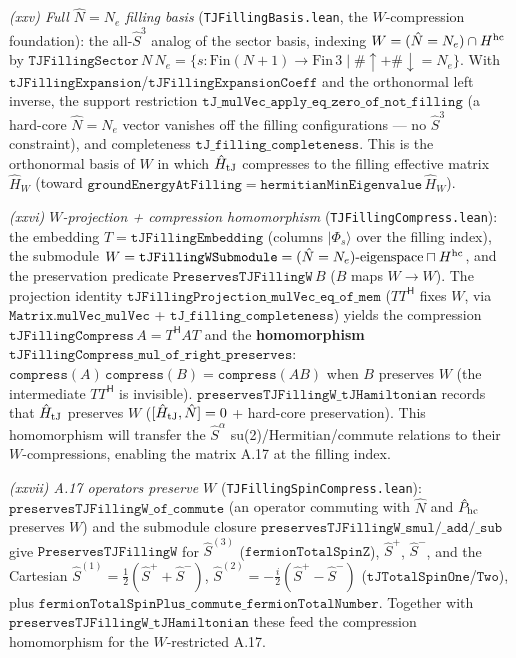 \documentclass[a4paper,11pt]{article}
\begin{document}
\emph{(xxv) Full $\hat N=N_e$ filling basis} (\texttt{TJFillingBasis.lean}, the $W$-compression
foundation): the all-$\hat S^3$ analog of the sector basis, indexing $W=(\hat N=N_e)\cap H^{\rm hc}$
by $\texttt{TJFillingSector}\,N\,N_e=\{s : \mathrm{Fin}(N{+}1)\to\mathrm{Fin}\,3 \mid \#{\uparrow}+\#{\downarrow}=N_e\}$.
With $\texttt{tJFillingExpansion}$/$\texttt{tJFillingExpansionCoeff}$ and the orthonormal left inverse,
the support restriction $\texttt{tJ\_mulVec\_apply\_eq\_zero\_of\_not\_filling}$ (a hard-core
$\hat N=N_e$ vector vanishes off the filling configurations — no $\hat S^3$ constraint), and
completeness $\texttt{tJ\_filling\_completeness}$.  This is the orthonormal basis of $W$ in which
$\hat H_{\rm tJ}$ compresses to the filling effective matrix $\hat H_W$ (toward
$\texttt{groundEnergyAtFilling}=\texttt{hermitianMinEigenvalue}\,\hat H_W$).

\emph{(xxvi) $W$-projection + compression homomorphism} (\texttt{TJFillingCompress.lean}): the
embedding $T=\texttt{tJFillingEmbedding}$ (columns $|\Phi_s\rangle$ over the filling index), the
submodule $W=\texttt{tJFillingWSubmodule}=(\hat N=N_e)\text{-eigenspace}\sqcap H^{\rm hc}$, and the
preservation predicate $\texttt{PreservesTJFillingW}\,B$ ($B$ maps $W\to W$).  The projection identity
$\texttt{tJFillingProjection\_mulVec\_eq\_of\_mem}$ ($T T^{\mathsf H}$ fixes $W$, via
$\texttt{Matrix.mulVec\_mulVec}$ + $\texttt{tJ\_filling\_completeness}$) yields the compression
$\texttt{tJFillingCompress}\,A = T^{\mathsf H} A T$ and the \textbf{homomorphism}
$\texttt{tJFillingCompress\_mul\_of\_right\_preserves}$: $\texttt{compress}(A)\,\texttt{compress}(B)
=\texttt{compress}(AB)$ when $B$ preserves $W$ (the intermediate $T T^{\mathsf H}$ is invisible).
$\texttt{preservesTJFillingW\_tJHamiltonian}$ records that $\hat H_{\rm tJ}$ preserves $W$ ($[\hat
H_{\rm tJ},\hat N]=0$ + hard-core preservation).  This homomorphism will transfer the $\hat S^\alpha$
su(2)/Hermitian/commute relations to their $W$-compressions, enabling the matrix A.17 at the filling
index.

\emph{(xxvii) A.17 operators preserve $W$} (\texttt{TJFillingSpinCompress.lean}):
$\texttt{preservesTJFillingW\_of\_commute}$ (an operator commuting with $\hat N$ and $\hat P_{\rm hc}$
preserves $W$) and the submodule closure $\texttt{preservesTJFillingW\_smul/\_add/\_sub}$ give
$\texttt{PreservesTJFillingW}$ for $\hat S^{(3)}$ ($\texttt{fermionTotalSpinZ}$), $\hat S^+$,
$\hat S^-$, and the Cartesian $\hat S^{(1)}=\tfrac12(\hat S^++\hat S^-)$,
$\hat S^{(2)}=-\tfrac{i}{2}(\hat S^+-\hat S^-)$ ($\texttt{tJTotalSpinOne}$/$\texttt{Two}$), plus
$\texttt{fermionTotalSpinPlus\_commute\_fermionTotalNumber}$.  Together with
$\texttt{preservesTJFillingW\_tJHamiltonian}$ these feed the compression homomorphism for the
$W$-restricted A.17.
\end{document}
